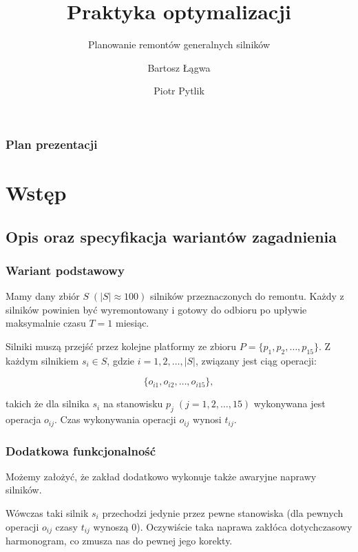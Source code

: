 \documentclass{beamer}
\begin{document}
\title{Praktyka optymalizacji}
\subtitle{Planowanie remontów generalnych silników}
\author[Bartosz Łągwa \& Piotr Pytlik]{Bartosz Łągwa \and Piotr Pytlik}

\begin{frame}
	\titlepage
\end{frame}

\begin{frame}
	\frametitle{Plan prezentacji}
	\tableofcontents
\end{frame}

\section{Wstęp}
	\subsection{Opis oraz specyfikacja wariantów zagadnienia}
		\begin{frame}
			\frametitle{Wariant podstawowy}
			
			Mamy dany zbiór $S \; (|S| \approx 100)$ silników przeznaczonych do remontu. Każdy z silników powinien być wyremontowany i gotowy do odbioru po upływie maksymalnie czasu $T = 1$ miesiąc.\bigskip
			
			Silniki muszą przejść przez kolejne platformy ze zbioru $P = \{p_1, p_2, \dots, p_{15}\}$. Z każdym silnikiem $s_i  \in S$, gdzie $i = 1, 2, \dots, |S|$, związany jest ciąg operacji:
			
			\begin{equation*}
				\{ o_{i1}, o_{i2}, \dots, o_{i15} \},
			\end{equation*}
			
			takich że dla silnika $s_i$ na stanowisku $p_j \; (j = 1, 2, \dots, 15)$ wykonywana jest operacja $o_{ij}$. Czas wykonywania operacji $o_{ij}$ wynosi $t_{ij}$.
		\end{frame}
		
		\begin{frame}
			\frametitle{Dodatkowa funkcjonalność}
			
			Możemy założyć, że zakład dodatkowo wykonuje także awaryjne naprawy silników. \bigskip
			
			Wówczas taki silnik $s_i$ przechodzi jedynie przez pewne stanowiska (dla pewnych operacji $o_{ij}$ czasy $t_{ij}$ wynoszą 0). Oczywiście taka naprawa zakłóca dotychczasowy harmonogram, co zmusza nas do pewnej jego korekty.
		\end{frame}
		
\end{document}
